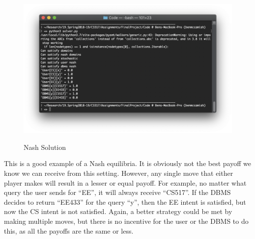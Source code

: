 \documentclass{article}
\begin{document}
\begin{figure}[h!]
\centering
\includegraphics[width=20cm]{images/nashPaper}
\label{fig:paper}
\caption{Nash Solution}
\end{figure}

This is a good example of a Nash equilibria. It is obviously not the best payoff we know we can receive from this setting. However, any single move that either player makes will result in a lesser or equal payoff. For example, no matter what query the user sends for ``EE'', it will always receive ``CS517''. If the DBMS decides to return ``EE433'' for the query ``y'', then the EE intent is satisfied, but now the CS intent is not satisfied. Again, a better strategy could be met by making multiple moves, but there is no incentive for the user or the DBMS to do this, as all the payoffs are the same or less. 
\end{document}
